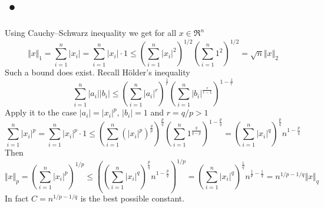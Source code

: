 \documentclass{article}
\begin{document}
\section*{•} 


Using Cauchy–Schwarz inequality we get for all $x\in\Re^n$ $$ \Vert x\Vert_1= \sum\limits_{i=1}^n|x_i|= \sum\limits_{i=1}^n|x_i|\cdot 1\leq \left(\sum\limits_{i=1}^n|x_i|^2\right)^{1/2}\left(\sum\limits_{i=1}^n 1^2\right)^{1/2}= \sqrt{n}\Vert x\Vert_2 $$
Such a bound does exist. Recall Hölder's inequality $$ \sum\limits_{i=1}^n |a_i||b_i|\leq \left(\sum\limits_{i=1}^n|a_i|^r\right)^{\frac{1}{r}}\left(\sum\limits_{i=1}^n|b_i|^{\frac{r}{r-1}}\right)^{1-\frac{1}{r}} $$ Apply it to the case $|a_i|=|x_i|^p$, $|b_i|=1$ and $r=q/p>1$ $$ \sum\limits_{i=1}^n |x_i|^p= \sum\limits_{i=1}^n |x_i|^p\cdot 1\leq \left(\sum\limits_{i=1}^n (|x_i|^p)^{\frac{q}{p}}\right)^{\frac{p}{q}} \left(\sum\limits_{i=1}^n 1^{\frac{q}{q-p}}\right)^{1-\frac{p}{q}}= \left(\sum\limits_{i=1}^n |x_i|^q\right)^{\frac{p}{q}} n^{1-\frac{p}{q}} $$ Then $$ \Vert x\Vert_p= \left(\sum\limits_{i=1}^n |x_i|^p\right)^{1/p}\leq \left(\left(\sum\limits_{i=1}^n |x_i|^q\right)^{\frac{p}{q}} n^{1-\frac{p}{q}}\right)^{1/p}= \left(\sum\limits_{i=1}^n |x_i|^q\right)^{\frac{1}{q}} n^{\frac{1}{p}-\frac{1}{q}}= n^{1/p-1/q}\Vert x\Vert_q $$ In fact $C=n^{1/p-1/q}$ is the best possible constant.
\end{document}
